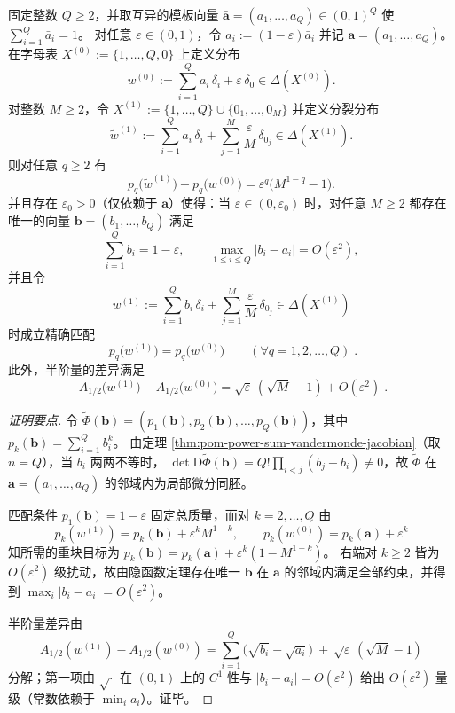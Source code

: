 \begin{theorem}\label{thm:pom-moment-camouflage-finite-orders}
固定整数 \(Q\ge 2\)，并取互异的模板向量 \(\bar{\mathbf a}=(\bar a_1,\dots,\bar a_Q)\in(0,1)^Q\) 使 \(\sum_{i=1}^{Q}\bar a_i=1\)。
对任意 \(\varepsilon\in(0,1)\)，令 \(a_i:=(1-\varepsilon)\bar a_i\) 并记 \(\mathbf a=(a_1,\dots,a_Q)\)。
在字母表
\(
X^{(0)}:=\{1,\dots,Q,0\}
\)
上定义分布
\[
w^{(0)}:=\sum_{i=1}^{Q}a_i\,\delta_i+\varepsilon\,\delta_0\in\Delta(X^{(0)}).
\]
对整数 \(M\ge 2\)，令
\(
X^{(1)}:=\{1,\dots,Q\}\cup\{0_1,\dots,0_M\}
\)
并定义分裂分布
\[
\widetilde w^{(1)}:=\sum_{i=1}^{Q}a_i\,\delta_i+\sum_{j=1}^{M}\frac{\varepsilon}{M}\,\delta_{0_j}\in\Delta(X^{(1)}).
\]
则对任意 \(q\ge 2\) 有
\[
p_q\!\bigl(\widetilde w^{(1)}\bigr)-p_q\!\bigl(w^{(0)}\bigr)
=\varepsilon^q\bigl(M^{1-q}-1\bigr).
\]
并且存在 \(\varepsilon_0>0\)（仅依赖于 \(\bar{\mathbf a}\)）使得：当 \(\varepsilon\in(0,\varepsilon_0)\) 时，对任意 \(M\ge 2\) 都存在唯一的向量 \(\mathbf b=(b_1,\dots,b_Q)\) 满足
\[
\sum_{i=1}^{Q}b_i=1-\varepsilon,\qquad
\max_{1\le i\le Q}|b_i-a_i|=O(\varepsilon^2),
\]
并且令
\[
w^{(1)}:=\sum_{i=1}^{Q}b_i\,\delta_i+\sum_{j=1}^{M}\frac{\varepsilon}{M}\,\delta_{0_j}\in\Delta(X^{(1)})
\]
时成立精确匹配
\[
\boxed{\;
p_q\!\bigl(w^{(1)}\bigr)=p_q\!\bigl(w^{(0)}\bigr)\qquad(\forall q=1,2,\dots,Q)\; }.
\]
此外，半阶量的差异满足
\[
\boxed{\;
A_{1/2}\!\bigl(w^{(1)}\bigr)-A_{1/2}\!\bigl(w^{(0)}\bigr)
=\sqrt{\varepsilon}\,(\sqrt{M}-1)+O(\varepsilon^2)\; }.
\]
\end{theorem}
\begin{proof}[证明要点]
令 \(\widetilde\Phi(\mathbf b)=(p_1(\mathbf b),p_2(\mathbf b),\dots,p_Q(\mathbf b))\)，其中
\(
p_k(\mathbf b)=\sum_{i=1}^{Q}b_i^k
\)。
由定理 \ref{thm:pom-power-sum-vandermonde-jacobian}（取 \(n=Q\)），当 \(b_i\) 两两不等时，
\(
\det \mathrm{D}\widetilde\Phi(\mathbf b)=Q!\prod_{i<j}(b_j-b_i)\neq 0
\)，故 \(\widetilde\Phi\) 在 \(\mathbf a=(a_1,\dots,a_Q)\) 的邻域内为局部微分同胚。
\par
匹配条件 \(p_1(\mathbf b)=1-\varepsilon\) 固定总质量，而对 \(k=2,\dots,Q\) 由
\[
p_k(w^{(1)})=p_k(\mathbf b)+\varepsilon^k M^{1-k},\qquad
p_k(w^{(0)})=p_k(\mathbf a)+\varepsilon^k
\]
知所需的重块目标为
\(
p_k(\mathbf b)=p_k(\mathbf a)+\varepsilon^k(1-M^{1-k})
\)。
右端对 \(k\ge 2\) 皆为 \(O(\varepsilon^2)\) 级扰动，故由隐函数定理存在唯一 \(\mathbf b\) 在 \(\mathbf a\) 的邻域内满足全部约束，并得到 \(\max_i|b_i-a_i|=O(\varepsilon^2)\)。
\par
半阶量差异由
\[
A_{1/2}(w^{(1)})-A_{1/2}(w^{(0)})
=\sum_{i=1}^{Q}\bigl(\sqrt{b_i}-\sqrt{a_i}\bigr)
\ +\ \sqrt{\varepsilon}\,(\sqrt{M}-1)
\]
分解；第一项由 \(\sqrt{\cdot}\) 在 \((0,1)\) 上的 \(C^1\) 性与 \(|b_i-a_i|=O(\varepsilon^2)\) 给出 \(O(\varepsilon^2)\) 量级（常数依赖于 \(\min_i a_i\)）。证毕。
\end{proof}

